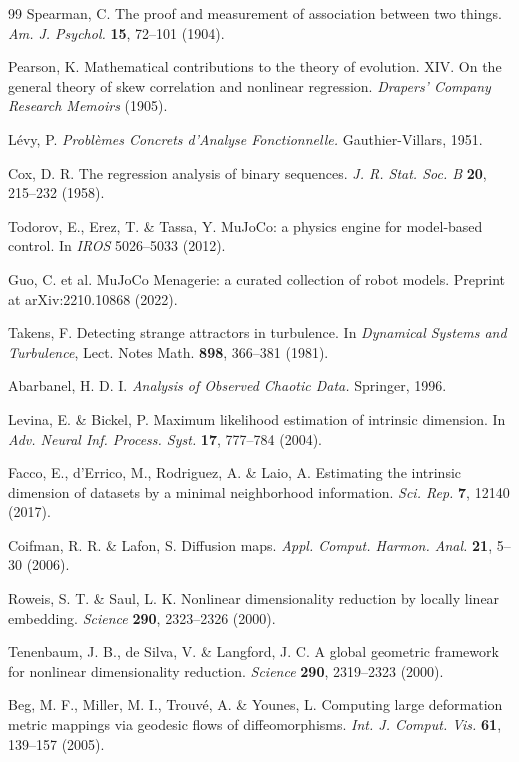 \documentclass[11pt]{article}
\begin{document}
\begin{thebibliography}{99}
 Spearman, C. The proof and measurement of association
between two things. \emph{Am. J. Psychol.} \textbf{15}, 72--101 (1904).

 Pearson, K. Mathematical contributions to the
theory of evolution. XIV. On the general theory of skew correlation and
nonlinear regression. \emph{Drapers' Company Research Memoirs} (1905).

 L\'evy, P. \emph{Probl\`emes Concrets d'Analyse
Fonctionnelle.} Gauthier-Villars, 1951.

 Cox, D. R. The regression analysis of binary sequences.
\emph{J. R. Stat. Soc. B} \textbf{20}, 215--232 (1958).

 Todorov, E., Erez, T. \& Tassa, Y. MuJoCo: a physics
engine for model-based control. In \emph{IROS} 5026--5033 (2012).

 Guo, C. et al. MuJoCo Menagerie: a curated collection of
robot models. Preprint at arXiv:2210.10868 (2022).

 Takens, F. Detecting strange attractors in turbulence.
In \emph{Dynamical Systems and Turbulence}, Lect. Notes Math. \textbf{898},
366--381 (1981).

 Abarbanel, H. D. I.
\emph{Analysis of Observed Chaotic Data.} Springer, 1996.

 Levina, E. \& Bickel, P. Maximum likelihood estimation of
intrinsic dimension. In \emph{Adv. Neural Inf. Process. Syst.} \textbf{17},
777--784 (2004).

 Facco, E., d'Errico, M., Rodriguez, A. \& Laio, A.
Estimating the intrinsic dimension of datasets by a minimal neighborhood
information. \emph{Sci. Rep.} \textbf{7}, 12140 (2017).

 Coifman, R. R. \& Lafon, S. Diffusion maps.
\emph{Appl. Comput. Harmon. Anal.} \textbf{21}, 5--30 (2006).

 Roweis, S. T. \& Saul, L. K. Nonlinear dimensionality
reduction by locally linear embedding. \emph{Science} \textbf{290},
2323--2326 (2000).

 Tenenbaum, J. B., de Silva, V. \& Langford, J. C.
A global geometric framework for nonlinear dimensionality reduction.
\emph{Science} \textbf{290}, 2319--2323 (2000).

 Beg, M. F., Miller, M. I., Trouv\'e, A. \& Younes, L.
Computing large deformation metric mappings via geodesic flows of
diffeomorphisms. \emph{Int. J. Comput. Vis.} \textbf{61}, 139--157 (2005).


\end{thebibliography}
\end{document}

